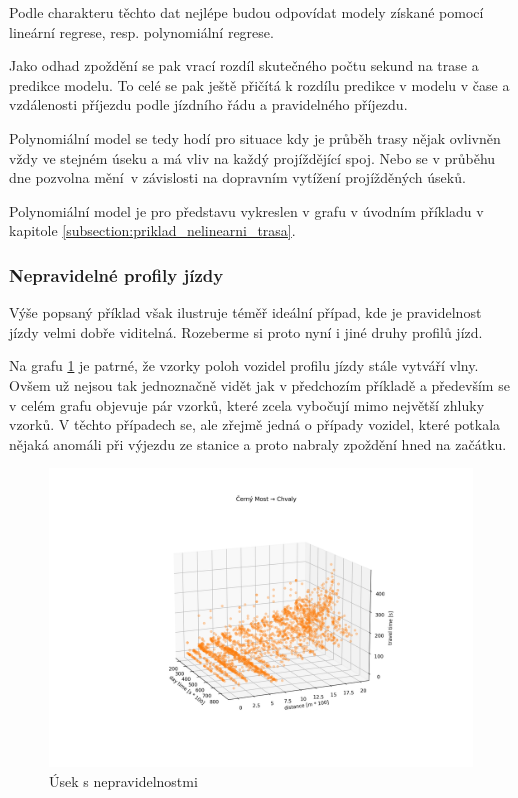 Podle charakteru těchto dat nejlépe budou odpovídat modely získané pomocí lineární regrese, resp. polynomiální regrese.

\bigbreak

Jako odhad zpoždění se pak vrací rozdíl skutečného počtu sekund na trase a predikce modelu. To celé se pak ještě přičítá k rozdílu predikce v modelu v čase a vzdálenosti příjezdu podle jízdního řádu a pravidelného příjezdu.

\bigbreak

Polynomiální model se tedy hodí pro situace kdy je průběh trasy nějak ovlivněn vždy ve stejném úseku a má vliv na každý projíždějící spoj. Nebo se v průběhu dne pozvolna mění v závislosti na dopravním vytížení projížděných úseků.

Polynomiální model je pro představu vykreslen v grafu v úvodním příkladu v kapitole \ref{subsection:priklad_nelinearni_trasa}.

\subsubsection{Nepravidelné profily jízdy}

Výše popsaný příklad však ilustruje téměř ideální případ, kde je pravidelnost jízdy velmi dobře viditelná. Rozeberme si proto nyní i jiné druhy profilů jízd.

\bigbreak

Na grafu \ref{fig:cerny_most_chvaly} je patrné, že vzorky poloh vozidel profilu jízdy stále vytváří vlny. Ovšem už nejsou tak jednoznačně vidět jak v předchozím příkladě a především se v celém grafu objevuje pár vzorků, které zcela vybočují mimo největší zhluky vzorků. V těchto případech se, ale zřejmě jedná o případy vozidel, které potkala nějaká anomáli při výjezdu ze stanice a proto nabraly zpoždění hned na začátku.

\begin{figure}
	\centering
  \includegraphics[width=\linewidth]{../img/cerny_most_chvaly.png}
  \caption{Úsek s nepravidelnostmi}
  \label{fig:cerny_most_chvaly}
\end{figure}

